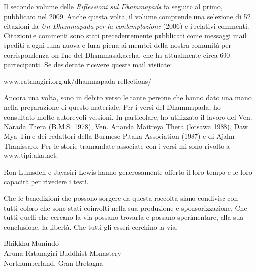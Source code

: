 
Il secondo volume delle \emph{Riflessioni sul Dhammapada} fa seguito al primo, pubblicato nel 2009. Anche questa volta, il volume comprende una selezione di 52 citazioni da \emph{Un Dhammapada per la contemplazione} (2006) e i relativi commenti. Citazioni e commenti sono stati precedentemente pubblicati come messaggi mail spediti a ogni luna nuova e luna piena ai membri della nostra comunit\`{a} per corrispondenza on-line del Dhammasakaccha, che ha attualmente circa 600 partecipanti. Se desiderate ricevere queste mail visitate:

\vspace*{0.2\baselineskip}
{\centering
www.ratanagiri.org.uk/dhammapada-reflections/

}
\vspace*{0.2\baselineskip}

Ancora una volta, sono in debito verso le tante persone che hanno dato una mano nella preparazione di questo materiale. Per i versi del Dhammapada, ho consultato molte autorevoli versioni. In particolare, ho utilizzato il lavoro del Ven. Narada Thera (B.M.S. 1978), Ven. Ananda Maitreya Thera (lotsawa 1988), Daw Mya Tin e dei redattori della Burmese Pitaka Association (1987) e di Ajahn Thanissaro. Per le storie tramandate associate con i versi mi sono rivolto  a www.tipitaka.net.

Ron Lumsden e Jayasiri Lewis hanno generosamente offerto il loro tempo e le loro capacit\`{a} per rivedere i testi.

Che le benedizioni che possono sorgere da questa raccolta siano condivise con tutti coloro che sono stati coinvolti nella sua produzione e sponsorizzazione. Che tutti quelli che cercano la via possano trovarla e possano sperimentare, alla sua conclusione, la libert\`{a}. Che tutti gli esseri cerchino la via.


{\par\raggedleft
Bhikkhu Munindo\\
Aruna Ratanagiri Buddhist Monastery\\
Northumberland, Gran Bretagna
\par}

